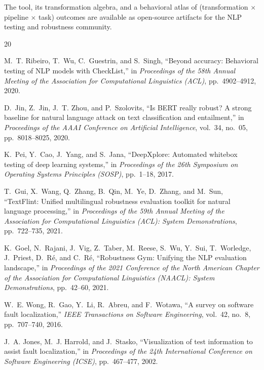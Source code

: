 \documentclass[sigconf,nonacm]{acmart}
\begin{document}
The tool, its transformation algebra, and a behavioral atlas of (transformation $\times$ pipeline $\times$ task) outcomes are available as open-source artifacts for the NLP testing and robustness community.


\begin{thebibliography}{20}

M.~T. Ribeiro, T.~Wu, C.~Guestrin, and S.~Singh,
``Beyond accuracy: Behavioral testing of {NLP} models with {CheckList},''
in \emph{Proceedings of the 58th Annual Meeting of the Association for Computational Linguistics (ACL)}, pp.~4902--4912, 2020.

D.~Jin, Z.~Jin, J.~T. Zhou, and P.~Szolovits,
``Is {BERT} really robust? {A} strong baseline for natural language attack on text classification and entailment,''
in \emph{Proceedings of the AAAI Conference on Artificial Intelligence}, vol.~34, no.~05, pp.~8018--8025, 2020.

K.~Pei, Y.~Cao, J.~Yang, and S.~Jana,
``{DeepXplore}: Automated whitebox testing of deep learning systems,''
in \emph{Proceedings of the 26th Symposium on Operating Systems Principles (SOSP)}, pp.~1--18, 2017.

T.~Gui, X.~Wang, Q.~Zhang, B.~Qin, M.~Ye, D.~Zhang, and M.~Sun,
``{TextFlint}: Unified multilingual robustness evaluation toolkit for natural language processing,''
in \emph{Proceedings of the 59th Annual Meeting of the Association for Computational Linguistics (ACL): System Demonstrations}, pp.~722--735, 2021.

K.~Goel, N.~Rajani, J.~Vig, Z.~Taber, M.~Reese, S.~Wu, Y.~Sui, T.~Worledge, J.~Priest, D.~R\'{e}, and C.~R\'{e},
``{Robustness Gym}: Unifying the {NLP} evaluation landscape,''
in \emph{Proceedings of the 2021 Conference of the North American Chapter of the Association for Computational Linguistics (NAACL): System Demonstrations}, pp.~42--60, 2021.

W.~E. Wong, R.~Gao, Y.~Li, R.~Abreu, and F.~Wotawa,
``A survey on software fault localization,''
\emph{IEEE Transactions on Software Engineering}, vol.~42, no.~8, pp.~707--740, 2016.

J.~A. Jones, M.~J. Harrold, and J.~Stasko,
``Visualization of test information to assist fault localization,''
in \emph{Proceedings of the 24th International Conference on Software Engineering (ICSE)}, pp.~467--477, 2002.


\end{thebibliography}
\end{document}
